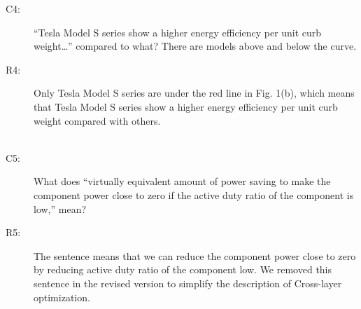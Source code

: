 \documentclass[onecolumn]{IEEEconf}
\begin{document}
\begin{description}
\item [C4: ]  “Tesla Model S series show a higher energy efficiency per unit curb weight…” compared to what? There are models above and below the curve.
\item [R4: ] Only Tesla Model S series are under the red line in Fig. 1(b), which means that Tesla Model S series show a higher energy efficiency per unit curb weight compared with others. \\
%
~\\
\item [C5: ] What does “virtually equivalent amount of power saving to make the component power close to zero if the active duty ratio of the component is low,” mean?
\item [R5: ] The sentence means that we can reduce the component power close to zero by reducing active duty ratio of the component low. We removed this sentence in the revised version to simplify the description of Cross-layer optimization.\\
~\\

\end{description}
\end{document}
